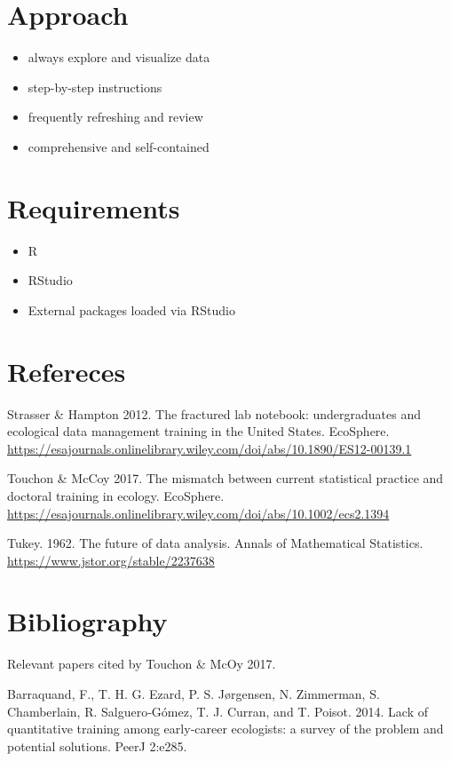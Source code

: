 \documentclass[]{book}
\providecommand{\tightlist}{%
  \setlength{\itemsep}{0pt}\setlength{\parskip}{0pt}}
\theoremstyle{definition}
\theoremstyle{definition}
\theoremstyle{definition}
\theoremstyle{remark}
\begin{document}
\section{Approach}\label{approach}

\begin{itemize}
\tightlist
\item
  always explore and visualize data
\item
  step-by-step instructions
\item
  frequently refreshing and review
\item
  comprehensive and self-contained
\end{itemize}

\section{Requirements}\label{requirements}

\begin{itemize}
\tightlist
\item
  R
\item
  RStudio
\item
  External packages loaded via RStudio
\end{itemize}

\section{Refereces}\label{refereces}

Strasser \& Hampton 2012. The fractured lab notebook: undergraduates and
ecological data management training in the United States. EcoSphere.
\url{https://esajournals.onlinelibrary.wiley.com/doi/abs/10.1890/ES12-00139.1}

Touchon \& McCoy 2017. The mismatch between current statistical practice
and doctoral training in ecology. EcoSphere.
\url{https://esajournals.onlinelibrary.wiley.com/doi/abs/10.1002/ecs2.1394}

Tukey. 1962. The future of data analysis. Annals of Mathematical
Statistics. \url{https://www.jstor.org/stable/2237638}

\section{Bibliography}\label{bibliography}

Relevant papers cited by Touchon \& McOy 2017.

Barraquand, F., T. H. G. Ezard, P. S. Jørgensen, N. Zimmerman, S.
Chamberlain, R. Salguero‐Gómez, T. J. Curran, and T. Poisot. 2014. Lack
of quantitative training among early‐career ecologists: a survey of the
problem and potential solutions. PeerJ 2:e285.
\end{document}
